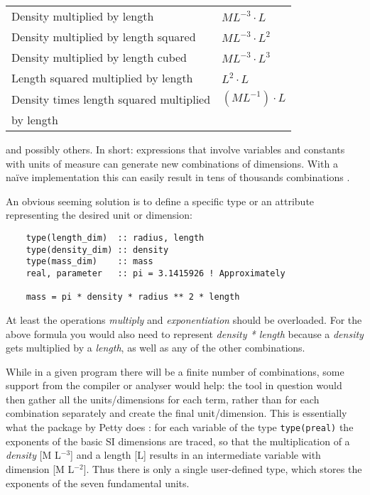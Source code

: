 \documentclass{article}
\begin{document}
\vspace{\baselineskip}
\begin{tabular}{ll}
\hline
Density multiplied by length                       &   $M L^{-3} \cdot L$   \\
Density multiplied by length squared               &   $M L^{-3} \cdot L^2$ \\
Density multiplied by length cubed                 &   $M L^{-3} \cdot L^3$ \\
Length squared multiplied by length                &   $L^2 \cdot L$        \\
Density times length squared multiplied            &   $(M L^{-1}) \cdot L$ \\
by length                                          &                        \\
\hline
\end{tabular}
\vspace{\baselineskip}

\noindent and possibly others. In short: expressions that involve variables and constants with units of measure can generate
new combinations of dimensions. With a na\"ive implementation this can easily result in tens of thousands
combinations \cite{UnitsOfMeasureFortran}.

An obvious seeming solution is to define a specific type or an attribute representing the desired unit or
dimension:

\begin{verbatim}
    type(length_dim)  :: radius, length
    type(density_dim) :: density
    type(mass_dim)    :: mass
    real, parameter   :: pi = 3.1415926 ! Approximately

    mass = pi * density * radius ** 2 * length
\end{verbatim}

At least the operations \emph{multiply} and \emph{exponentiation} should be overloaded.
For the above formula you would also need to represent \emph{density * length} because a \emph{density} gets
multiplied by a \emph{length}, as well as any of the other combinations.

While in a given program there will be a finite number of combinations, some support from the compiler or analyser
would help: the tool in question would then gather all the units/dimensions for each term, rather than for each
combination separately and create the final unit/dimension. This is essentially what the package by Petty
does \cite{PhysUnitsPetty}: for each variable of the type \verb+type(preal)+ the exponents of the basic SI dimensions are traced, so that the
multiplication of a \emph{density} [M L$^{-3}$] and a length [L] results in an intermediate variable with dimension
[M L$^{-2}$]. Thus there is only a single user-defined type, which stores the exponents of the seven fundamental units.
\end{document}
